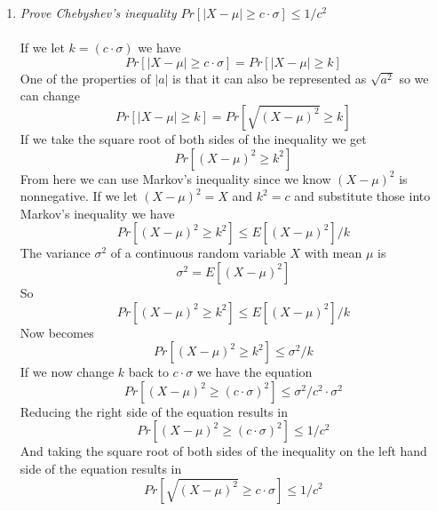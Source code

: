 \documentclass[12pt]{article}
\begin{document}
\begin{enumerate}
\begin{enumerate}
		\newpage
		\item \textit{Prove Chebyshev's inequality $Pr[|X-\mu| \ge c \cdot \sigma] \le 1/c^2$}\\
		\\
		If we let $k = (c \cdot \sigma)$ we have
			$$
			Pr[|X-\mu| \ge c \cdot \sigma] = Pr[|X-\mu| \ge k]
			$$
		One of the properties of $|a|$ is that it can also be represented as $\sqrt{a^2}$ so we can change\\
			$$
			Pr[|X-\mu| \ge k] = Pr[\sqrt{(X-\mu)^2} \ge k]
			$$
		If we take the square root of both sides of the inequality we get
			$$
			Pr[(X-\mu)^2 \ge k^2]
			$$
		From here we can use Markov's inequality since we know $(X-\mu)^2$ is nonnegative.  If we let $(X-\mu)^2 = X$ and $k^2 = c$ and substitute those into Markov's inequality we have 
			$$
			Pr[(X-\mu)^2 \ge k^2] \le E[(X-\mu)^2]/k
			$$
		The variance $\sigma^2$ of a continuous random variable $X$ with mean $\mu$ is 
			$$
			\sigma^2 = E[(X-\mu)^2]
			$$
		So
			$$
			Pr[(X-\mu)^2 \ge k^2] \le E[(X-\mu)^2]/k
			$$
		Now becomes
			$$
			Pr[(X-\mu)^2 \ge k^2] \le \sigma^2/k
			$$
		If we now change $k$ back to $c \cdot \sigma$ we have the equation
			$$
			Pr[(X-\mu)^2 \ge (c \cdot \sigma)^2] \le \sigma^2/c^2 \cdot \sigma^2
			$$
		Reducing the right side of the equation results in
			$$
			Pr[(X-\mu)^2 \ge (c \cdot \sigma)^2] \le 1/c^2
			$$
		And taking the square root of both sides of the inequality on the left hand side of the equation results in
			$$
			Pr[\sqrt{(X-\mu)^2} \ge c \cdot \sigma] \le 1/c^2
			$$ 
		

\end{enumerate}
\end{enumerate}
\end{document}
